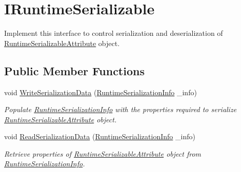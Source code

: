 \hypertarget{interface_voxel_busters_1_1_runtime_serialization_1_1_i_runtime_serializable}{}\section{I\+Runtime\+Serializable}
\label{interface_voxel_busters_1_1_runtime_serialization_1_1_i_runtime_serializable}


Implement this interface to control serialization and deserialization of \hyperlink{class_voxel_busters_1_1_runtime_serialization_1_1_runtime_serializable_attribute}{Runtime\+Serializable\+Attribute} object.  


\subsection*{Public Member Functions}
\begin{DoxyCompactItemize}
\item 
void \hyperlink{interface_voxel_busters_1_1_runtime_serialization_1_1_i_runtime_serializable_ad0d562a5e94e40838224b0a126f87c43}{Write\+Serialization\+Data} (\hyperlink{class_voxel_busters_1_1_runtime_serialization_1_1_runtime_serialization_info}{Runtime\+Serialization\+Info} \+\_\+info)
\begin{DoxyCompactList}\small\item\em Populate \hyperlink{class_voxel_busters_1_1_runtime_serialization_1_1_runtime_serialization_info}{Runtime\+Serialization\+Info} with the properties required to serialize \hyperlink{class_voxel_busters_1_1_runtime_serialization_1_1_runtime_serializable_attribute}{Runtime\+Serializable\+Attribute} object. \end{DoxyCompactList}\item 
void \hyperlink{interface_voxel_busters_1_1_runtime_serialization_1_1_i_runtime_serializable_a052bee3d106563961eb5f7d0d7a26756}{Read\+Serialization\+Data} (\hyperlink{class_voxel_busters_1_1_runtime_serialization_1_1_runtime_serialization_info}{Runtime\+Serialization\+Info} \+\_\+info)
\begin{DoxyCompactList}\small\item\em Retrieve properties of \hyperlink{class_voxel_busters_1_1_runtime_serialization_1_1_runtime_serializable_attribute}{Runtime\+Serializable\+Attribute} object from \hyperlink{class_voxel_busters_1_1_runtime_serialization_1_1_runtime_serialization_info}{Runtime\+Serialization\+Info}. \end{DoxyCompactList}\end{DoxyCompactItemize}


